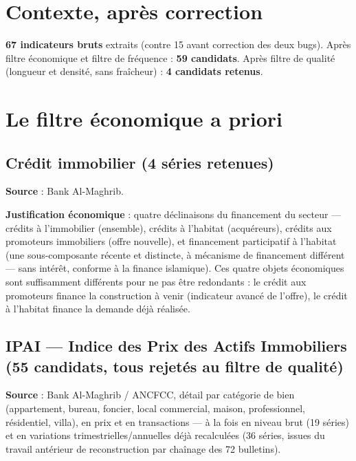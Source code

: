 \documentclass[11pt,a4paper]{article}
\begin{document}
\section{Contexte, après correction}

\begin{fichebox}
\textbf{67 indicateurs bruts} extraits (contre 15 avant correction des deux bugs). Après filtre économique et filtre de fréquence : \textbf{59 candidats}. Après filtre de qualité (longueur et densité, sans fraîcheur) : \textbf{4 candidats retenus}.
\end{fichebox}

\section{Le filtre économique a priori}

\subsection{Crédit immobilier (4 séries retenues)}

\textbf{Source} : Bank Al-Maghrib.

\textbf{Justification économique} : quatre déclinaisons du financement du secteur --- crédits à l'immobilier (ensemble), crédits à l'habitat (acquéreurs), crédits aux promoteurs immobiliers (offre nouvelle), et financement participatif à l'habitat (une sous-composante récente et distincte, à mécanisme de financement différent --- sans intérêt, conforme à la finance islamique). Ces quatre objets économiques sont suffisamment différents pour ne pas être redondants : le crédit aux promoteurs finance la construction à venir (indicateur avancé de l'offre), le crédit à l'habitat finance la demande déjà réalisée.

\subsection{IPAI --- Indice des Prix des Actifs Immobiliers (55 candidats, tous rejetés au filtre de qualité)}

\textbf{Source} : Bank Al-Maghrib / ANCFCC, détail par catégorie de bien (appartement, bureau, foncier, local commercial, maison, professionnel, résidentiel, villa), en prix et en transactions --- à la fois en niveau brut (19 séries) et en variations trimestrielles/annuelles déjà recalculées (36 séries, issues du travail antérieur de reconstruction par chaînage des 72 bulletins).
\end{document}
